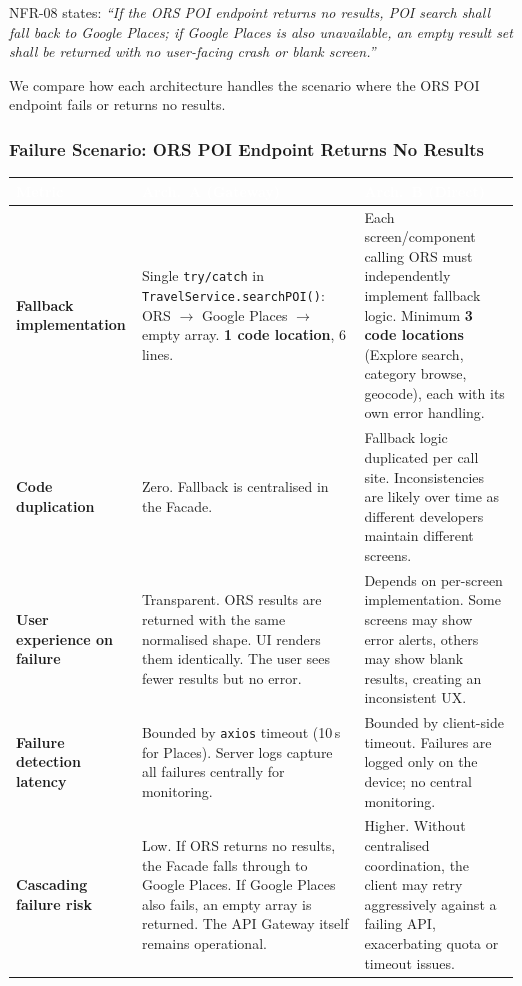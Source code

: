 \documentclass[12pt, a4paper]{article}
\newcommand{\thcell}[1]{\textcolor{white}{\textbf{\small #1}}}
\newcommand{\code}[1]{\texttt{\small #1}}
\newcommand{\reqid}[1]{\textsc{\small #1}}
\begin{document}
\reqid{NFR-08} states: \emph{``If the ORS POI endpoint returns no results, POI search shall fall back to Google Places; if Google Places is also unavailable, an empty result set shall be returned with no user-facing crash or blank screen.''}

We compare how each architecture handles the scenario where the ORS POI endpoint fails or returns no results.

\subsubsection{Failure Scenario: ORS POI Endpoint Returns No Results}

\begin{longtable}{L{3.0cm} L{5.0cm} L{5.0cm}}
\toprule
{}
\thcell{Metric} & \thcell{Arch.\ A (Gateway)} & \thcell{Arch.\ B (Direct)} \\
\midrule
\endhead
\bottomrule
\endfoot

\textbf{Fallback implementation} &
Single \code{try/catch} in \code{TravelService.searchPOI()}: ORS $\to$ Google Places $\to$ empty array. \textbf{1 code location}, 6 lines. &
Each screen/component calling ORS must independently implement fallback logic. Minimum \textbf{3 code locations} (Explore search, category browse, geocode), each with its own error handling. \\

\textbf{Code duplication} &
Zero. Fallback is centralised in the Facade. &
Fallback logic duplicated per call site. Inconsistencies are likely over time as different developers maintain different screens. \\

\textbf{User experience on failure} &
Transparent. ORS results are returned with the same normalised shape. UI renders them identically. The user sees fewer results but no error. &
Depends on per-screen implementation. Some screens may show error alerts, others may show blank results, creating an inconsistent UX. \\

\textbf{Failure detection latency} &
Bounded by \code{axios} timeout (10\,s for Places). Server logs capture all failures centrally for monitoring. &
Bounded by client-side timeout. Failures are logged only on the device; no central monitoring. \\

\textbf{Cascading failure risk} &
Low. If ORS returns no results, the Facade falls through to Google Places. If Google Places also fails, an empty array is returned. The API Gateway itself remains operational. &
Higher. Without centralised coordination, the client may retry aggressively against a failing API, exacerbating quota or timeout issues. \\

\end{longtable}
\end{document}
